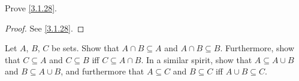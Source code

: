 \begin{ex}\label{ex:3.1.6}
  Prove \cref{3.1.28}.
\end{ex}

\begin{proof}
  See \cref{3.1.28}.
\end{proof}

\begin{ex}\label{ex:3.1.7}
  Let \(A\), \(B\), \(C\) be sets.
  Show that \(A \cap B \subseteq A\) and \(A \cap B \subseteq B\).
  Furthermore, show that \(C \subseteq A\) and \(C \subseteq B\) iff \(C \subseteq A \cap B\).
  In a similar spirit, show that \(A \subseteq A \cup B\) and \(B \subseteq A \cup B\), and furthermore that \(A \subseteq C\) and \(B \subseteq C\) iff \(A \cup B \subseteq C\).
\end{ex}

